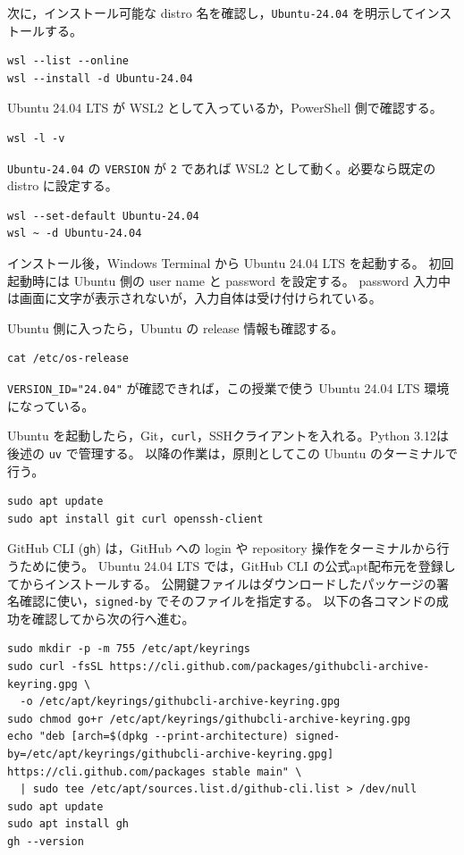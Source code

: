 次に，インストール可能な distro 名を確認し，\texttt{Ubuntu-24.04} を明示してインストールする。

\begin{lstlisting}[style=codecell]
wsl --list --online
wsl --install -d Ubuntu-24.04
\end{lstlisting}

Ubuntu 24.04 LTS が WSL2 として入っているか，PowerShell 側で確認する。

\begin{lstlisting}[style=codecell]
wsl -l -v
\end{lstlisting}

\texttt{Ubuntu-24.04} の \texttt{VERSION} が \texttt{2} であれば WSL2 として動く。必要なら既定の distro に設定する。

\begin{lstlisting}[style=codecell]
wsl --set-default Ubuntu-24.04
wsl ~ -d Ubuntu-24.04
\end{lstlisting}

インストール後，Windows Terminal から
Ubuntu 24.04 LTS を起動する。
初回起動時には Ubuntu 側の user name と password を設定する。
password 入力中は画面に文字が表示されないが，入力自体は受け付けられている。

Ubuntu 側に入ったら，Ubuntu の release 情報も確認する。

\begin{lstlisting}[style=codecell]
cat /etc/os-release
\end{lstlisting}

\texttt{VERSION\_ID="24.04"} が確認できれば，この授業で使う Ubuntu 24.04 LTS 環境になっている。

Ubuntu を起動したら，Git，\texttt{curl}，SSHクライアントを入れる。Python 3.12は後述の \texttt{uv} で管理する。
以降の作業は，原則としてこの Ubuntu のターミナルで行う。

\begin{lstlisting}[style=codecell]
sudo apt update
sudo apt install git curl openssh-client
\end{lstlisting}

GitHub CLI (\texttt{gh}) は，GitHub への login や repository 操作をターミナルから行うために使う。
Ubuntu 24.04 LTS では，GitHub CLI の公式apt配布元を登録してからインストールする。
公開鍵ファイルはダウンロードしたパッケージの署名確認に使い，\texttt{signed-by} でそのファイルを指定する。
以下の各コマンドの成功を確認してから次の行へ進む。

\begin{lstlisting}[style=codecell]
sudo mkdir -p -m 755 /etc/apt/keyrings
sudo curl -fsSL https://cli.github.com/packages/githubcli-archive-keyring.gpg \
  -o /etc/apt/keyrings/githubcli-archive-keyring.gpg
sudo chmod go+r /etc/apt/keyrings/githubcli-archive-keyring.gpg
echo "deb [arch=$(dpkg --print-architecture) signed-by=/etc/apt/keyrings/githubcli-archive-keyring.gpg] https://cli.github.com/packages stable main" \
  | sudo tee /etc/apt/sources.list.d/github-cli.list > /dev/null
sudo apt update
sudo apt install gh
gh --version
\end{lstlisting}


